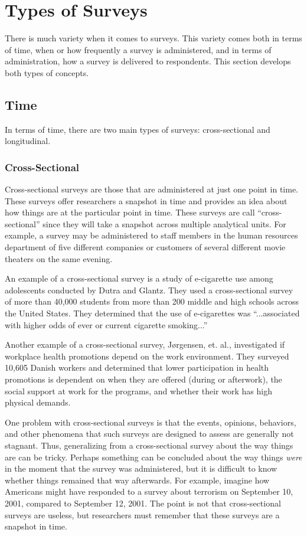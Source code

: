 \section{Types of Surveys}

There is much variety when it comes to surveys. This variety comes both in terms of time, when or how frequently a survey is administered, and in terms of administration, how a survey is delivered to respondents. This section develops both types of concepts.

\subsection{Time}

In terms of time, there are two main types of surveys: cross-sectional and longitudinal.

\subsubsection{Cross-Sectional}

Cross-sectional surveys are those that are administered at just one point in time. These surveys offer researchers a snapshot in time and provides an idea about how things are at the particular point in time. These surveys are call ``cross-sectional'' since they will take a snapshot across multiple analytical units. For example, a survey may be administered to staff members in the human resources department of five different companies or customers of several different movie theaters on the same evening. 

An example of a cross-sectional survey is a study of e-cigarette use among adolescents conducted by Dutra and Glantz\cite{dutra2014electronic}. They used a cross-sectional survey of more than 40,000 students from more than 200 middle and high schools across the United States. They determined that the use of e-cigarettes was ``...associated with higher odds of ever or current cigarette smoking...''

Another example of a cross-sectional survey, J\o{}rgensen, et. al.\cite{jorgensen2016does}, investigated if workplace health promotions depend on the work environment. They surveyed 10,605 Danish workers and determined that lower participation in health promotions is dependent on when they are offered (during or afterwork), the social support at work for the programs, and whether their work has high physical demands.

One problem with cross-sectional surveys is that the events, opinions, behaviors, and other phenomena that such surveys are designed to assess are generally not stagnant. Thus, generalizing from a cross-sectional survey about the way things are can be tricky. Perhaps something can be concluded about the way things \textit{were} in the moment that the survey was administered, but it is difficult to know whether things remained that way afterwards. For example, imagine how Americans might have responded to a survey about terrorism on September 10, 2001, compared to September 12, 2001. The point is not that cross-sectional surveys are useless, but researchers must remember that these surveys are a snapshot in time.

